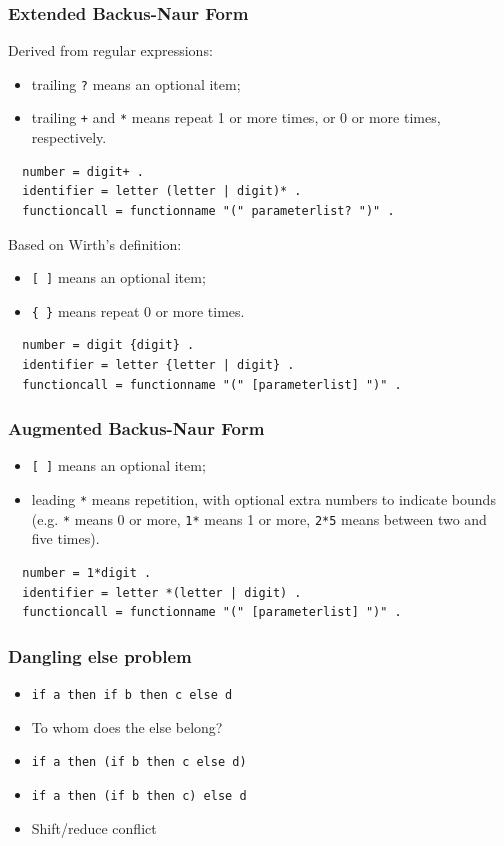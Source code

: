 \documentclass{beamer}
\begin{document}
\begin{frame}[fragile]
  \frametitle{Extended Backus-Naur Form}
  Derived from regular expressions:
  \begin{itemize}
    \item trailing%
      \texttt{?} means an optional item;
    \item trailing \texttt{+} and \texttt{*} means repeat 1 or more times, or 0
      or more times, respectively.
  \end{itemize}
  \begin{verbatim}
  number = digit+ .
  identifier = letter (letter | digit)* .
  functioncall = functionname "(" parameterlist? ")" .
  \end{verbatim}

  \vfill

  Based on Wirth's definition:
  \begin{itemize}
    \item \texttt{[ ]} means an optional item;
    \item \texttt{\{ \}} means repeat 0 or more times.
  \end{itemize}
  \begin{verbatim}
  number = digit {digit} .
  identifier = letter {letter | digit} .
  functioncall = functionname "(" [parameterlist] ")" .
  \end{verbatim}
\end{frame}

\begin{frame}[fragile]
  \frametitle{Augmented Backus-Naur Form}
  \begin{itemize}
    \item \texttt{[ ]} means an optional item;
    \item leading \texttt{*} means repetition, with optional extra numbers to
      indicate bounds (e.g. \texttt{*} means 0 or more, \texttt{1*} means 1 or
      more, \texttt{2*5} means between two and five times).
  \end{itemize}
  \vfill
  \begin{verbatim}
  number = 1*digit .
  identifier = letter *(letter | digit) .
  functioncall = functionname "(" [parameterlist] ")" .
  \end{verbatim}
\end{frame}

\begin{frame}
  \frametitle{Dangling else problem}
  \begin{itemize}
      \item \texttt{if a then if b then c else d}
      \item To whom does the else belong?
      \item \texttt{if a then (if b then c else d)}
      \item \texttt{if a then (if b then c) else d}
      \item Shift/reduce conflict
    \end{itemize}
\end{frame}
\end{document}
